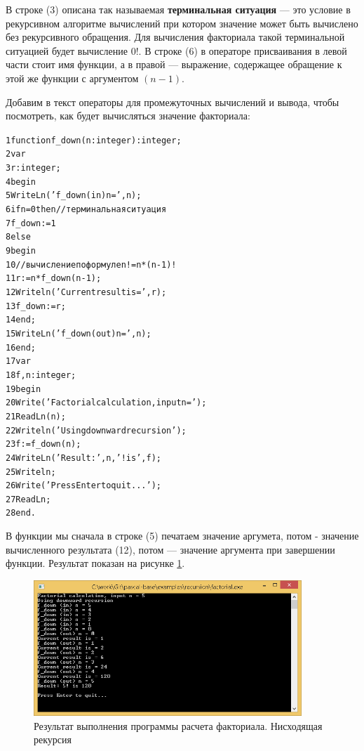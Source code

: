 \documentclass[12pt,a4paper]{article}
\begin{document}
В строке (3) описана так называемая \textbf{терминальная ситуация} --- это условие в рекурсивном алгоритме вычислений при котором значение может быть вычислено без рекурсивного обращения. Для вычисления факториала такой терминальной ситуацией будет вычисление $0!$. 
В строке (6)  в операторе присваивания в левой части стоит имя функции, а в правой --- выражение, содержащее обращение к этой же функции с аргументом $(n-1)$. 

Добавим в текст операторы для промежуточных вычислений и вывода, чтобы посмотреть, как будет вычисляться значение факториала:

\begin{alltt}
1 function f\_down(n: integer):integer;
2 var
3   r: integer;
4 begin
5   WriteLn('f\_down (in) n = ', n);
6   if n = 0 then //терминальная ситуация
7     f\_down := 1
8   else
9     begin
10      //вычисление по формуле n! = n*(n-1)!
11      r := n * f\_down(n - 1);
12      Writeln('Current result is = ', r);
13      f\_down := r;
14    end;
15    WriteLn('f\_down (out) n = ', n);
16 end;
17 var 
18   f, n: integer;
19 begin
20   Write('Factorial calculation, input n = ');
21   ReadLn(n);
22   Writeln('Using downward recursion');
23   f := f\_down(n);
24   WriteLn('Result: ', n, '! is ', f);
25   Writeln;
26   Write('Press Enter to quit...');
27   ReadLn;
28 end.
\end{alltt}

В функции мы сначала в строке (5) печатаем значение аргумета, потом - значение вычисленного результата (12), потом --- значение аргумента при завершении функции. Результат показан на рисунке \ref{pic01}.

\begin{figure}[ht!]
	\centering	
	\includegraphics[width=0.9\textwidth]{images/lec14-pic01.png}
	\caption{Результат выполнения программы расчета факториала. Нисходящая рекурсия}
	\label{pic01}
\end{figure}
\end{document}
